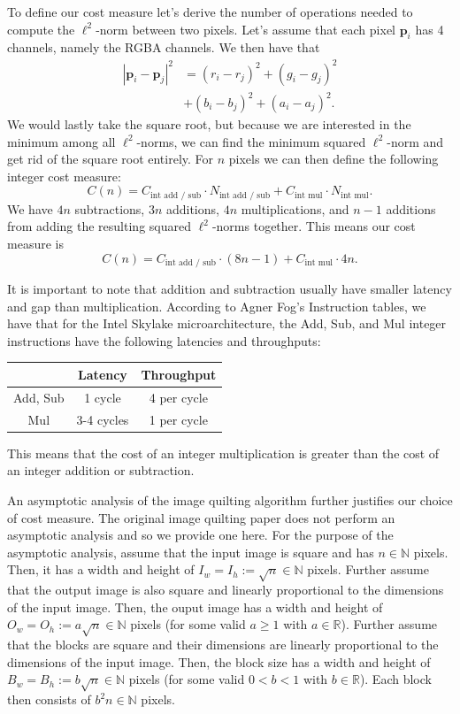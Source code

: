 \documentclass[letterpaper]{article}
\newcommand{\R}[0]{\mathbb{R}}
\newcommand{\N}[0]{\mathbb{N}}
\begin{document}
To define our cost measure let's derive the number of operations needed to compute the $\ell ^2$-norm between two pixels. Let's assume that each pixel $\bm{p}_i$ has 4 channels, namely the RGBA channels. We then have that
\begin{align*}
  |\bm{p}_i - \bm{p}_j| ^2 & = (r_i - r_j)^2 + (g_i - g_j)^2 \\
  & + (b_i - b_j)^2 + (a_i - a_j)^2.
\end{align*}
We would lastly take the square root, but because we are interested in the minimum among all $\ell ^2$-norms, we can find the minimum squared $\ell ^2$-norm and get rid of the square root entirely. For $n$ pixels we can then define the following integer cost measure:
\[
  C(n) = C _\text{int add / sub} \cdot N _\text{int add / sub} + C_\text{int mul} \cdot N _\text{int mul}.
\]
We have $4n$ subtractions, $3n$ additions, $4n$ multiplications, and $n-1$ additions from adding the resulting squared $\ell ^2$-norms together. This means our cost measure is
\[
  C(n) = C _\text{int add / sub} \cdot (8n - 1) + C_\text{int mul} \cdot 4n.
\]

It is important to note that addition and subtraction usually have smaller latency and gap than multiplication. According to Agner Fog's Instruction tables, we have that for the Intel Skylake microarchitecture, the Add, Sub, and Mul integer instructions have the following latencies and throughputs:

\begin{center}
  \begin{tabular}{c|c|c}
    & Latency & Throughput \\
    \hline
    Add, Sub & 1 cycle & 4 per cycle \\
    \hline
    Mul & 3-4 cycles & 1 per cycle \\
  \end{tabular}
\end{center}

This means that the cost of an integer multiplication is greater than the cost of an integer addition or subtraction.

An asymptotic analysis of the image quilting algorithm further justifies our choice of cost measure. The original image quilting paper \cite{Efros:01} does not perform an asymptotic analysis and so we provide one here. For the purpose of the asymptotic analysis, assume that the input image is square and has $n \in \N$ pixels. Then, it has a width and height of $I_w = I_h := \sqrt{n} \in \N$ pixels. Further assume that the output image is also square and linearly proportional to the dimensions of the input image. Then, the ouput image has a width and height of $O_w = O_h := a \sqrt{n} \in \N$ pixels (for some valid $a \ge 1$ with $a \in \R$). Further assume that the blocks are square and their dimensions are linearly proportional to the dimensions of the input image. Then, the block size has a width and height of $B_w = B_h := b \sqrt{n} \in \N$ pixels (for some valid $0 < b < 1$ with $b \in \R$). Each block then consists of $b^2 n \in \N$ pixels.
\end{document}
